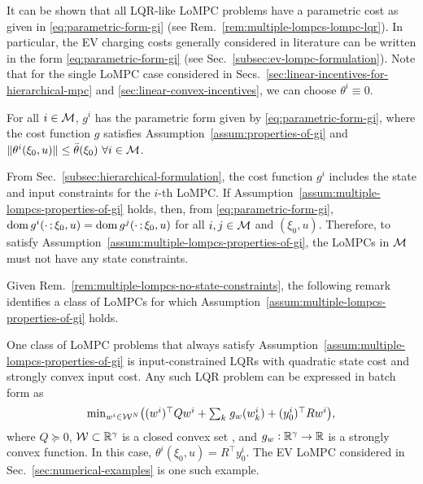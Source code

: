 It can be shown that all LQR-like LoMPC problems have a parametric cost as given in \eqref{eq:parametric-form-gi} (see Rem.~\ref{rem:multiple-lompcs-lompc-lqr}).
In particular, the EV charging costs generally considered in literature can be written in the form \eqref{eq:parametric-form-gi} (see Sec.~\ref{subsec:ev-lompc-formulation}).
Note that for the single LoMPC case considered in Secs.~\ref{sec:linear-incentives-for-hierarchical-mpc} and \ref{sec:linear-convex-incentives}, we can choose $\theta^i \equiv 0$.

\begin{assumption}
\label{assum:multiple-lompcs-properties-of-gi}
For all $i \in \mathcal{M}$, $g^i$ has the parametric form given by \eqref{eq:parametric-form-gi}, where the cost function $g$ satisfies Assumption~\ref{assum:properties-of-gi} and $\lVert \theta^i(\xi_0, u) \rVert \leq \bar{\theta}(\xi_0) \ \forall i \in \mathcal{M}$.
\end{assumption}

\begin{remark}
\label{rem:multiple-lompcs-no-state-constraints}
From Sec.~\ref{subsec:hierarchical-formulation}, the cost function $g^i$ includes the state and input constraints for the $i$-th LoMPC.
If Assumption~\ref{assum:multiple-lompcs-properties-of-gi} holds, then, from \eqref{eq:parametric-form-gi}, $\operatorname{dom}{g^i}(\cdot \, ; \xi_0, u) = \operatorname{dom}{g^j}(\cdot \, ; \xi_0, u)$ for all $i, j \in \mathcal{M}$ and $(\xi_0, u)$.
Therefore, to satisfy Assumption~\ref{assum:multiple-lompcs-properties-of-gi}, the LoMPCs in $\mathcal{M}$ must not have any state constraints.
\end{remark}

Given Rem.~\ref{rem:multiple-lompcs-no-state-constraints}, the following remark identifies a class of LoMPCs for which Assumption~\ref{assum:multiple-lompcs-properties-of-gi} holds.

\begin{remark}
\label{rem:multiple-lompcs-lompc-lqr}
One class of LoMPC problems that always satisfy Assumption~\ref{assum:multiple-lompcs-properties-of-gi} is input-constrained LQRs with quadratic state cost and strongly convex input cost.
Any such LQR problem can be expressed in batch form as \cite[Sec.~8.2]{borrelli2017predictive}
\begin{equation}
\label{eq:input-constrained-lqr}
    \textstyle{\min}_{w^i \in \mathcal{W}^N} \bigl( (w^i)^\top Q w^i + \textstyle{\sum}_k \; g_w(w^i_k) + (y^i_0)^\top R w^i \bigr),
\end{equation}
where $Q \succeq 0$, $\mathcal{W} \subset \mathbb{R}^\gamma$ is a closed convex set , and $g_w: \mathbb{R}^\gamma \rightarrow \mathbb{R}$ is a strongly convex function.
In this case, $\theta^i(\xi_0, u) = R^\top y^i_0$.
The EV LoMPC considered in Sec.~\ref{sec:numerical-examples} is one such example.
\end{remark}

